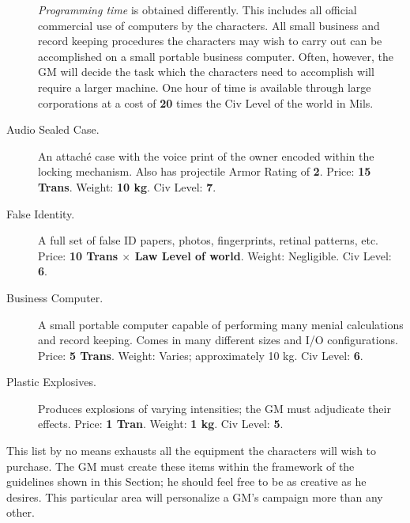 \begin{description}
  \emph{Programming time} is obtained differently. This includes all
  official commercial use of computers by the characters. All small
  business and record keeping procedures the characters may wish to
  carry out can be accomplished on a small portable business computer.
  Often, however, the GM will decide the task which the characters
  need to accomplish will require a larger machine. One hour of time
  is available through large corporations at a cost of \textbf{20}
  times the Civ Level of the world in Mils.
\item[\hypertarget{tag:audio-sealed-case}{Audio Sealed Case}.] An attach\'e case with the voice print of
  the owner encoded within the locking mechanism. Also has projectile
  Armor Rating of \textbf{2}. Price: \textbf{15 Trans}. Weight:
  \textbf{10 kg}. Civ Level: \textbf{7}.
\item[\hypertarget{tag:false-identity}{False Identity}.] A full set of false ID papers, photos,
  fingerprints, retinal patterns, etc. Price: \textbf{10 Trans $\times$
  Law Level of world}. Weight:
  Negligible. Civ Level: \textbf{6}.
\item[\hypertarget{tag:buscomp}{Business Computer}.] A small portable computer capable of
  performing many menial calculations and record keeping. Comes in
  many different sizes and I/O configurations. Price: \textbf{5
    Trans}. Weight: Varies; approximately 10 kg. Civ Level:
  \textbf{6}.
\item[Plastic Explosives.] Produces explosions of varying intensities;
  the GM must adjudicate their effects. Price: \textbf{1 Tran}.
  Weight: \textbf{1 kg}.  Civ Level: \textbf{5}.
\end{description}

This list by no means exhausts all the equipment the characters will
wish to purchase. The GM must create these items within the framework
of the guidelines shown in this Section; he should feel free to be as
creative as he desires. This particular area will personalize a GM's
campaign more than any other.

